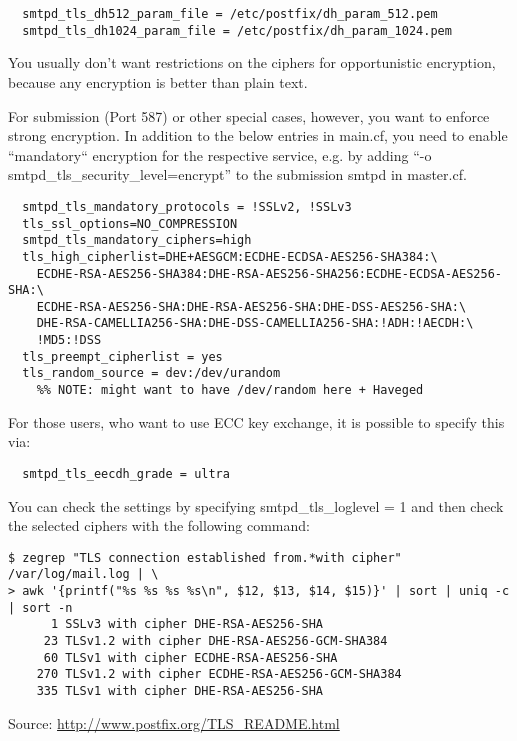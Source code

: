 \begin{verbatim}
  smtpd_tls_dh512_param_file = /etc/postfix/dh_param_512.pem
  smtpd_tls_dh1024_param_file = /etc/postfix/dh_param_1024.pem
\end{verbatim}

You usually don't want restrictions on the ciphers for opportunistic
encryption, because any encryption is better than plain text. 

For submission (Port 587) or other special cases, however, you want to
enforce strong encryption. In addition to the below entries in
main.cf, you need to enable ``mandatory`` encryption for the
respective service, e.g. by adding ``-o
smtpd\_tls\_security\_level=encrypt'' to the submission smtpd in
master.cf.


\begin{verbatim}
  smtpd_tls_mandatory_protocols = !SSLv2, !SSLv3
  tls_ssl_options=NO_COMPRESSION
  smtpd_tls_mandatory_ciphers=high
  tls_high_cipherlist=DHE+AESGCM:ECDHE-ECDSA-AES256-SHA384:\
    ECDHE-RSA-AES256-SHA384:DHE-RSA-AES256-SHA256:ECDHE-ECDSA-AES256-SHA:\
    ECDHE-RSA-AES256-SHA:DHE-RSA-AES256-SHA:DHE-DSS-AES256-SHA:\
    DHE-RSA-CAMELLIA256-SHA:DHE-DSS-CAMELLIA256-SHA:!ADH:!AECDH:\
    !MD5:!DSS
  tls_preempt_cipherlist = yes
  tls_random_source = dev:/dev/urandom		
    %% NOTE: might want to have /dev/random here + Haveged
\end{verbatim}
  
For those users, who want to use ECC key exchange, it is possible to specify this via:
\begin{verbatim}
  smtpd_tls_eecdh_grade = ultra
\end{verbatim}

You can check the settings by specifying  smtpd\_tls\_loglevel = 1 and then check the selected ciphers with the following command:
\begin{verbatim}
$ zegrep "TLS connection established from.*with cipher" /var/log/mail.log | \
> awk '{printf("%s %s %s %s\n", $12, $13, $14, $15)}' | sort | uniq -c | sort -n
      1 SSLv3 with cipher DHE-RSA-AES256-SHA
     23 TLSv1.2 with cipher DHE-RSA-AES256-GCM-SHA384
     60 TLSv1 with cipher ECDHE-RSA-AES256-SHA
    270 TLSv1.2 with cipher ECDHE-RSA-AES256-GCM-SHA384
    335 TLSv1 with cipher DHE-RSA-AES256-SHA
\end{verbatim}

Source: \url{http://www.postfix.org/TLS_README.html}

